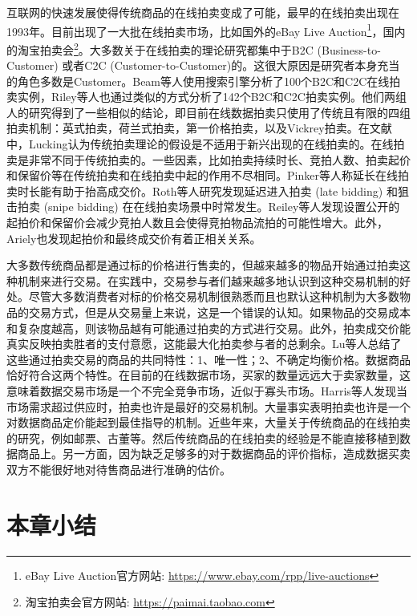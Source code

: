 互联网的快速发展使得传统商品的在线拍卖变成了可能，最早的在线拍卖出现在1993年\cite{Lucking2000Auctions}。目前出现了一大批在线拍卖市场，比如国外的eBay Live Auction\footnote{eBay Live Auction官方网站: \url{https://www.ebay.com/rpp/live-auctions}}，国内的淘宝拍卖会\footnote{淘宝拍卖会官方网站: \url{https://paimai.taobao.com}}。大多数关于在线拍卖的理论研究都集中于B2C (Business-to-Customer) 或者C2C (Customer-to-Customer)的。这很大原因是研究者本身充当的角色多数是Customer。Beam等人\cite{Beam1998Auctions}使用搜索引擎分析了100个B2C和C2C在线拍卖实例，Riley等人\cite{Riley1981Optimal}也通过类似的方式分析了142个B2C和C2C拍卖实例。他们两组人的研究得到了一些相似的结论，即目前在线数据拍卖只使用了传统且有限的四组拍卖机制：英式拍卖，荷兰式拍卖，第一价格拍卖，以及Vickrey拍卖。在文献\cite{Lucking2000Auctions}中，Lucking认为传统拍卖理论的假设是不适用于新兴出现的在线拍卖的。在线拍卖是非常不同于传统拍卖的。一些因素，比如拍卖持续时长、竞拍人数、拍卖起价和保留价等在传统拍卖和在线拍卖中起的作用不尽相同。Pinker等人\cite{Pinker2003Managing,Pinker2001Using}称延长在线拍卖时长能有助于抬高成交价。Roth等人\cite{Roth2002Last}研究发现延迟进入拍卖 (late bidding) 和狙击拍卖 (snipe bidding) 在在线拍卖场景中时常发生。Reiley等人\cite{Ockenfels2006Online}发现设置公开的起拍价和保留价会减少竞拍人数且会使得竞拍物品流拍的可能性增大。此外，Ariely\cite{Dan2003Buying}也发现起拍价和最终成交价有着正相关关系。

大多数传统商品都是通过标的价格进行售卖的，但越来越多的物品开始通过拍卖这种机制来进行交易。在实践中，交易参与者们越来越多地认识到这种交易机制的好处。尽管大多数消费者对标的价格交易机制很熟悉而且也默认这种机制为大多数物品的交易方式，但是从交易量上来说，这是一个错误的认知。如果物品的交易成本和复杂度越高，则该物品越有可能通过拍卖的方式进行交易\cite{Pinker2003Managing}。此外，拍卖成交价能真实反映拍卖胜者的支付意愿，这能最大化拍卖参与者的总剩余。Lu等人\cite{Lu1996The}总结了这些通过拍卖交易的商品的共同特性：1、唯一性；2、不确定均衡价格。数据商品恰好符合这两个特性。在目前的在线数据市场，买家的数量远远大于卖家数量，这意味着数据交易市场是一个不完全竞争市场，近似于寡头市场。Harris等人\cite{Harris1981A}发现当市场需求超过供应时，拍卖也许是最好的交易机制。大量事实表明拍卖也许是一个对数据商品定价能起到最佳指导的机制。近些年来，大量关于传统商品的在线拍卖的研究\cite{Pinker2003Managing,Lucking2000Auctions,Pinker2001Using,Ockenfels2006Online,Dan2003Buying}，例如邮票、古董等。然后传统商品的在线拍卖的经验是不能直接移植到数据商品上。另一方面，因为缺乏足够多的对于数据商品的评价指标，造成数据买卖双方不能很好地对待售商品进行准确的估价。

\section{本章小结}

